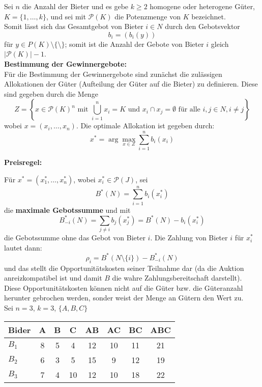 \documentclass[12pt]{extreport} %
\theoremstyle{named}
\theoremstyle{nnamed}
\theoremstyle{itshape}
\theoremstyle{normal}
\begin{document}
Sei $n$ die Anzahl der Bieter und es gebe $k \geq 2$ homogene oder heterogene Güter, $K = \{ 1, \dotsc, k\}$, und sei mit $\mathcal{P}(K)$ die Potenzmenge von $K$ bezeichnet. ~\\

Somit lässt sich das Gesamtgebot von Bieter $i \in N$ durch den Gebotsvektor
$$ b_{i} = \left( b_{i}(y) \right) $$
für $y \in P(K) \setminus \{ \setminus \}$; somit ist die Anzahl der Gebote von Bieter $i$ gleich $\left| \mathcal{P}(K) \right| - 1$. ~\\


\textbf{Bestimmung der Gewinnergebote:} ~\\

Für die Bestimmung der Gewinnergebote sind zunächst die zulässigen Allokationen der Güter (Aufteilung der Güter auf die Bieter) zu definieren. Diese sind gegeben durch die Menge
$$Z = \left\{ x \in \mathcal{P}(K)^{n} \text{ mit } \bigcup_{i=1}^{n} x_{i} = K \text{ und } x_{i} \cap x_{j} = \emptyset \text{ für alle } i, j \in N, i \neq j \right\}$$
wobei $x = \left( x_{i}, \dotsc, x_{n} \right)$. Die optimale Allokation ist gegeben durch: 
$$x^{*} = \arg \max_{x \in Z } \sum_{i=1}^{n} b_{i}(x_{i}) $$

\textbf{Preisregel:} ~\\ 

Für $x^{*} = \left( x_1^{*}, \dotsc, x_{n}^{*} \right)$, wobei $x_{i}^{*} \in \mathcal{P}(J)$, sei
	$$ B^{*}(N) = \sum_{i=1}^{n} b_{i}(x_{i}^{*}) $$
die \textbf{maximale Gebotssumme} und mit 
	$$ B_{-i}^{*}(N) = \sum_{j \neq i} b_{j}(x_{j}^{*}) = B^{*}(N) - b_{i}(x_{i}^{*}) $$
die Gebotssumme ohne das Gebot von Bieter $i$. Die Zahlung von Bieter $i$ für $x_{i}^{*}$ lautet dann:
$$ \rho_{i} = B^{*}\left(N \setminus \{ i \} \right) - B_{-i}^{*}(N) $$
und das stellt die Opportunitätskosten seiner Teilnahme dar (da die Auktion anreizkompatibel ist und damit $B$ die wahre Zahlungsbereitschaft darstellt). Diese Opportunitätskosten können nicht auf die Güter bzw. die Güteranzahl herunter gebrochen werden, sonder weist der Menge an Gütern den Wert zu. ~\\



Sei $n=3$, $k=3$, $\{ A, B, C\}$ 

\begin{figure*}[h!] \centering
	\begin{tabular}{l|ccccccc}
  		Bider & A & B &  C & AB & AC & BC & ABC \\
  						\hline
  		$B_1$ & 8 & 5 &  4 & 12 & 10 & 11 & 21  \\
  		$B_2$ & 6 & 3 &  5 & 15 &  9 & 12 & 19  \\
  		$B_3$ & 7 & 4 & 10 & 12 & 10 & 18 & 22 
	\end{tabular}
\end{figure*}	
\end{document}
